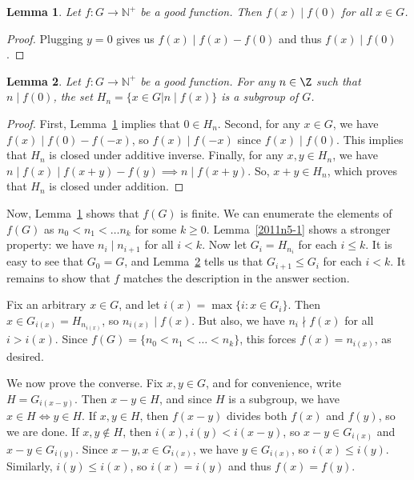 \documentclass{article}
\newcommand{\N}{\mathbb{N}}
\newtheorem{lemma}{Lemma}
\begin{document}
\begin{lemma}\label{2011n5-2}
Let $f : G \to \N^+$ be a good function.
Then $f(x) \mid f(0)$ for all $x \in G$.
\end{lemma}
\begin{proof}
Plugging $y = 0$ gives us $f(x) \mid f(x) - f(0)$ and thus $f(x) \mid f(0)$.
\end{proof}

\begin{lemma}\label{2011n5-3}
Let $f : G \to \N^+$ be a good function.
For any $n \in \Z$ such that $n \mid f(0)$, the set $H_n = \{x \in G | n \mid f(x)\}$ is a subgroup of $G$.
\end{lemma}
\begin{proof}
First, Lemma~\ref{2011n5-2} implies that $0 \in H_n$.
Second, for any $x \in G$, we have $f(x) \mid f(0) - f(-x)$, so $f(x) \mid f(-x)$ since $f(x) \mid f(0)$.
This implies that $H_n$ is closed under additive inverse.
Finally, for any $x, y \in H_n$, we have $n \mid f(x) \mid f(x + y) - f(y) \implies n \mid f(x + y)$.
So, $x + y \in H_n$, which proves that $H_n$ is closed under addition.
\end{proof}

Now, Lemma~\ref{2011n5-2} shows that $f(G)$ is finite.
We can enumerate the elements of $f(G)$ as $n_0 < n_1 < \ldots n_k$ for some $k \geq 0$.
Lemma~\ref{2011n5-1} shows a stronger property: we have $n_i \mid n_{i + 1}$ for all $i < k$.
Now let $G_i = H_{n_i}$ for each $i \leq k$.
It is easy to see that $G_0 = G$, and Lemma~\ref{2011n5-3} tells us that $G_{i + 1} \leq G_i$ for each $i < k$.
It remains to show that $f$ matches the description in the answer section.

Fix an arbitrary $x \in G$, and let $i(x) = \max\{i : x \in G_i\}$.
Then $x \in G_{i(x)} = H_{n_{i(x)}}$, so $n_{i(x)} \mid f(x)$.
But also, we have $n_i \nmid f(x)$ for all $i > i(x)$.
Since $f(G) = \{n_0 < n_1 < \ldots < n_k\}$, this forces $f(x) = n_{i(x)}$, as desired.

We now prove the converse.
Fix $x, y \in G$, and for convenience, write $H = G_{i(x - y)}$.
Then $x - y \in H$, and since $H$ is a subgroup, we have $x \in H \iff y \in H$.
If $x, y \in H$, then $f(x - y)$ divides both $f(x)$ and $f(y)$, so we are done.
If $x, y \notin H$, then $i(x), i(y) < i(x - y)$, so $x - y \in G_{i(x)}$ and $x - y \in G_{i(y)}$.
Since $x - y, x \in G_{i(x)}$, we have $y \in G_{i(x)}$, so $i(x) \leq i(y)$.
Similarly, $i(y) \leq i(x)$, so $i(x) = i(y)$ and thus $f(x) = f(y)$.
\end{document}
